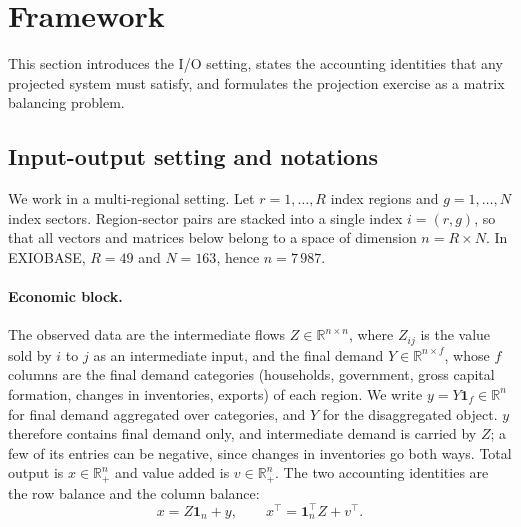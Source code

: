 \documentclass[11pt,a4paper]{article}
\begin{document}
\section{Framework}
\label{sec:framework}

This section introduces the I/O setting, states the accounting identities that any projected system must satisfy, and formulates the projection exercise as a matrix balancing problem.

\subsection{Input-output setting and notations}
\label{sub:setting}

We work in a multi-regional setting. Let $r = 1, \dots, R$ index regions and $g = 1, \dots, N$ index sectors. Region-sector pairs are stacked into a single index $i = (r,g)$, so that all vectors and matrices below belong to a space of dimension $n = R \times N$. In EXIOBASE, $R = 49$ and $N = 163$, hence $n = 7\,987$.

\paragraph{Economic block.}
The observed data are the intermediate flows $Z \in \mathbb{R}^{n \times n}$, where $Z_{ij}$ is the value sold by $i$ to $j$ as an intermediate input, and the final demand $Y \in \mathbb{R}^{n \times f}$, whose $f$ columns are the final demand categories (households, government, gross capital formation, changes in inventories, exports) of each region. We write $y = Y \mathbf{1}_f \in \mathbb{R}^n$ for final demand aggregated over categories, and $Y$ for the disaggregated object. $y$ therefore contains final demand only, and intermediate demand is carried by $Z$; a few of its entries can be negative, since changes in inventories go both ways. Total output is $x \in \mathbb{R}^n_+$ and value added is $v \in \mathbb{R}^n_+$. The two accounting identities are the row balance and the column balance:
\begin{equation}\label{eq:balance}
  x = Z \mathbf{1}_n + y,
  \qquad
  x^\top = \mathbf{1}_n^\top Z + v^\top .
\end{equation}
\end{document}
